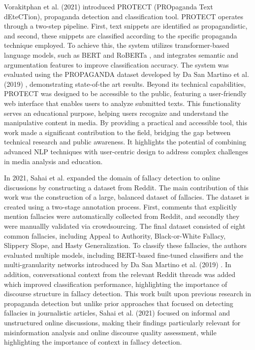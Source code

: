 Vorakitphan et al. (2021) \cite{vorakitphanPROTECTPipelinePropaganda2022} introduced PROTECT (PROpaganda Text dEteCTion), propaganda detection and classification tool. PROTECT operates through a two-step pipeline. First, text snippets are identified as propagandistic, and second, these snippets are classified according to the specific propaganda technique employed. To achieve this, the system utilizes transformer-based language models, such as BERT and RoBERTa \cite{kenton2019bert, liu2019roberta}, and integrates semantic and argumentation features to improve classification accuracy. The system was evaluated using the PROPAGANDA dataset developed by Da San Martino et al. (2019) \cite{dasanmartinoFineGrainedAnalysisPropaganda2019}, demonstrating state-of-the art results. Beyond its technical capabilities, PROTECT was designed to be accessible to the public, featuring a user-friendly web interface that enables users to analyze submitted texts. This functionality serves an educational purpose, helping users recognize and understand the manipulative content in media. By providing a practical and accessible tool, this work made a significant contribution to the field, bridging the gap between technical research and public awareness. It highlights the potential of combining advanced NLP techniques with user-centric design to address complex challenges in media analysis and education.
\par

In 2021, Sahai et al. expanded the domain of fallacy detection to online discussions by constructing a dataset from Reddit.
The main contribution of this work was the construction of a large, balanced dataset of fallacies. The dataset is created using a two-stage annotation process. First, comments that explicitly mention fallacies were automatically collected from Reddit, and secondly they were manuallly validated via crowdsourcing. The final dataset consisted of eight common fallacies, including Appeal to Authority, Black-or-White Fallacy, Slippery Slope, and Hasty Generalization.
To classify these fallacies, the authors evaluated multiple models, including BERT-based fine-tuned classifiers and the multi-granularity networks introduced by Da San Martino et al. (2019) \cite{dasanmartinoFineGrainedAnalysisPropaganda2019}.
In addition, conversational context from the relevant Reddit threads was added which improved classification performance, highlighting the importance of discourse structure in fallacy detection.
This work built upon previous research in propaganda detection but unlike prior approaches that focused on detecting fallacies in journalistic articles, Sahai et al. (2021) focused on informal and unstructured online discussions, making their findings particularly relevant for misinformation analysis and online discourse quality assessment, while highlighting the importance of context in fallacy detection.
\par

